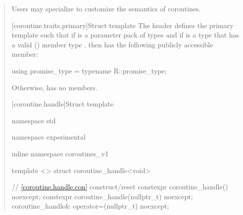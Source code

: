 \begin{quote}
\pnum
Users may specialize 
to customize the semantics of coroutines.

%
%

[coroutine.traits.primary]{Struct template }
\pnum The header  defines
the primary template  such that 
if  is a parameter pack of types and if  is a type that has a valid () member type , then
 has the following publicly accessible member:

\begin{codeblock}
  using promise_type = typename R::promise_type;
\end{codeblock}

Otherwise,  has no members.
	

[coroutine.handle]{Struct template }

%
\begin{codeblock}
namespace std {
namespace experimental {
inline namespace coroutines_v1 {

  template <>
  struct coroutine_handle<void>
  {
    // \ref{coroutine.handle.con} construct/reset
    constexpr coroutine_handle() noexcept;		
    constexpr coroutine_handle(nullptr_t) noexcept;
    coroutine_handle& operator=(nullptr_t) noexcept;
    
}}}}
\end{codeblock}
\end{quote}
